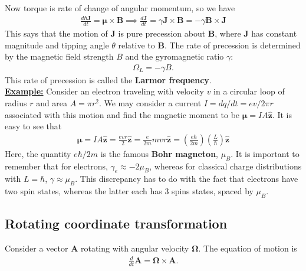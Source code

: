 \documentclass{book}
\theoremstyle{definition}
\newcommand{\f}[2]{\frac{#1}{#2}}
\newcommand{\lp}{\left(}
\newcommand{\rp}{\right)}
\begin{document}
Now torque is rate of change of angular momentum, so we have 
\begin{align*}
	\f{d\hbar \bm{J}}{dt} = \bm{\mu}\times \bm{B} \implies \boxed{\f{d\bm{J}}{dt} = \gamma \bm{J}\times \bm{B} = -\gamma \bm{B}\times \bm{J}}
\end{align*}
This says that the motion of $\bm{J}$ is pure precession about $\bm{B}$, where $\bm{J}$ has constant magnitude and tipping angle $\theta$ relative to $\bm{B}$. The rate of precession is determined by the magnetic field strength $B$ and the gyromagnetic ratio $\gamma$:
\begin{align*}
	\Omega_L = -\gamma B.
\end{align*}
This rate of precession is called the \textbf{Larmor frequency}.\\



\noindent \underline{\textbf{Example:}} Consider an electron traveling with velocity $v$ in a circular loop of radius $r$ and area $A = \pi r^2$. We may consider a current $I = dq/dt = e v/2\pi r$ associated with this motion and find the magnetic moment to be $\bm{\mu} = I A \hat{\bm{z}}$. It is easy to see that 
\begin{align*}
	\bm{\mu} = I A \hat{\bm{z}} = \f{evr}{2} \hat{\bm{z}} = \f{e}{2m} mvr \hat{\bm{z}} = \lp \f{e\hbar}{2m} \rp \lp \f{L}{\hbar} \rp \hat{\bm{z}}
\end{align*}
Here, the quantity $e\hbar / 2m$ is the famous \textbf{Bohr magneton}, $\mu_B$. It is important to remember that for electrons, $\gamma_e \approx -2\mu_B$, whereas for classical charge distributions with $L = \hbar$, $\gamma \approx \mu_B$. This discrepancy has to do with the fact that electrons have two spin states, whereas the latter each has 3 spins states, spaced by $\mu_B$.





\subsection{Rotating coordinate transformation}


Consider a vector $\bm{A}$ rotating with angular velocity $\bm{\Omega}$. The equation of motion is 
\begin{align*}
	\f{d}{dt} \bm{A} = \bm{\Omega} \times \bm{A}.
\end{align*}
\end{document}
